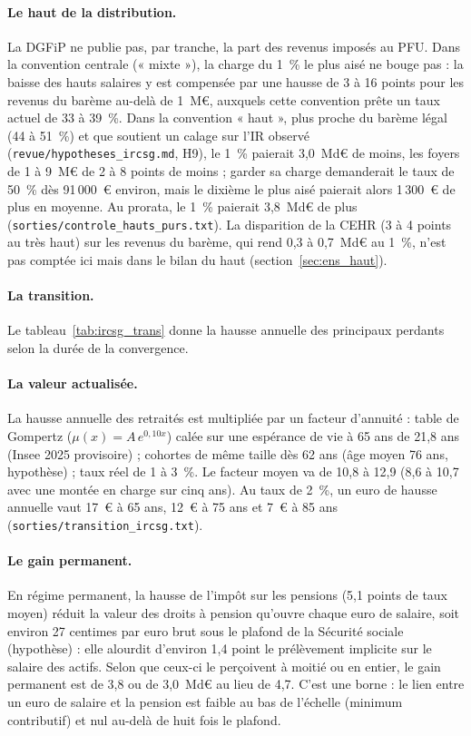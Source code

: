 

\paragraph{Le haut de la distribution.} La DGFiP ne publie pas, par tranche, la part des revenus imposés au PFU. Dans la
convention centrale (« mixte »), la charge du 1~\% le plus aisé ne bouge pas : la baisse des hauts salaires y est
compensée par une hausse de 3 à 16 points pour les revenus du barème au-delà de 1~M€, auxquels cette convention prête un
taux actuel de 33 à 39~\%. Dans la convention « haut », plus proche du barème légal (44 à 51~\%) et que soutient un
calage sur l'IR observé (\texttt{revue/hypotheses\_ircsg.md}, H9), le 1~\% paierait 3,0~Md€ de moins, les foyers de 1 à
9~M€ de 2 à 8 points de moins ; garder sa charge demanderait le taux de 50~\% dès 91\,000~€ environ, mais le dixième le
plus aisé paierait alors 1\,300~€ de plus en moyenne. Au prorata, le 1~\% paierait 3,8~Md€ de plus
(\texttt{sorties/controle\_hauts\_purs.txt}). La disparition de la CEHR (3 à 4 points au très haut) sur les revenus du
barème, qui rend 0,3 à 0,7~Md€ au 1~\%, n'est pas comptée ici mais dans le bilan du haut (section~\ref{sec:ens_haut}).

\paragraph{La transition.} Le tableau~\ref{tab:ircsg_trans} donne la hausse annuelle des principaux perdants selon la
durée de la convergence.



\paragraph{La valeur actualisée.} La hausse annuelle des retraités est multipliée par un facteur d'annuité : table de
Gompertz ($\mu(x) = A\,e^{0,10x}$) calée sur une espérance de vie à 65 ans de 21,8 ans (Insee 2025 provisoire) ;
cohortes de même taille dès 62 ans (âge moyen 76 ans, hypothèse) ; taux réel de 1 à 3~\%. Le facteur moyen va de 10,8 à
12,9 (8,6 à 10,7 avec une montée en charge sur cinq ans). Au taux de 2~\%, un euro de hausse annuelle vaut 17~€ à 65
ans, 12~€ à 75 ans et 7~€ à 85 ans (\texttt{sorties/transition\_ircsg.txt}).

\paragraph{Le gain permanent.} En régime permanent, la hausse de l'impôt sur les pensions (5,1 points de taux moyen)
réduit la valeur des droits à pension qu'ouvre chaque euro de salaire, soit environ 27 centimes par euro brut sous le
plafond de la Sécurité sociale (hypothèse) : elle alourdit d'environ 1,4 point le prélèvement implicite sur le salaire
des actifs. Selon que ceux-ci le perçoivent à moitié ou en entier, le gain permanent est de 3,8 ou de 3,0~Md€ au lieu de
4,7. C'est une borne : le lien entre un euro de salaire et la pension est faible au bas de l'échelle (minimum
contributif) et nul au-delà de huit fois le plafond.


